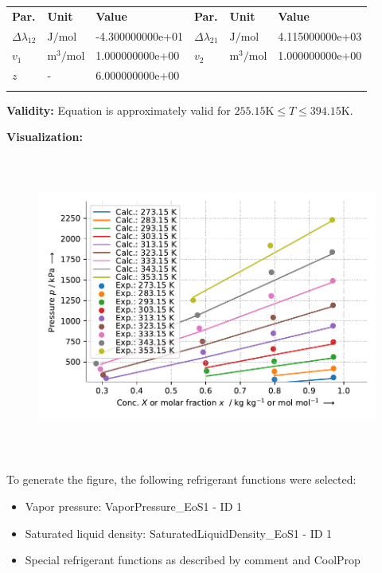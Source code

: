 \begin{longtable}[l]{lll|lll}
\toprule
\addlinespace
\textbf{Par.} & \textbf{Unit} & \textbf{Value} &	\textbf{Par.} & \textbf{Unit} & \textbf{Value} \\
\addlinespace
\midrule
\endhead

\bottomrule
\endfoot
\bottomrule
\endlastfoot
\addlinespace

$\Delta\lambda_{12}$ & $\si{\joule\per\mole}$ & -4.300000000e+01 & $\Delta\lambda_{21}$ & $\si{\joule\per\mole}$ & 4.115000000e+03 \\
$v_1$ & $\si{\cubic\meter\per\mole}$ & 1.000000000e+00 & $v_2$ & $\si{\cubic\meter\per\mole}$ & 1.000000000e+00 \\
$z$ & - & 6.000000000e+00 & & & \\

\addlinespace\end{longtable}

\textbf{Validity:}
\newline
Equation is approximately valid for $255.15 \si{\kelvin} \leq T \leq 394.15 \si{\kelvin}$.
\newline

\textbf{Visualization:}
%
\begin{figure}[!htp]
{\noindent\includegraphics[height=10cm, keepaspectratio]{figs/abs/abs_R-12_paraffinic__WangChao_1.pdf}}
\end{figure}
%

To generate the figure, the following refrigerant functions were selected:
\begin{itemize}
\item Vapor pressure: VaporPressure\_EoS1 - ID 1
\item Saturated liquid density: SaturatedLiquidDensity\_EoS1 - ID 1
\item Special refrigerant functions as described by comment and CoolProp
\end{itemize}

